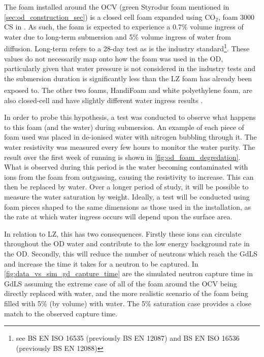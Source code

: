 \par
The foam installed around the OCV (green Styrodur foam mentioned in \autoref{sec:od_construction_sec}) is a closed cell foam expanded using CO$_2$, foam 3000 CS in \cite{styrodur_water_ingress_ref}.
As such, the foam is expected to experience a 0.7\% volume ingress of water due to long-term submersion and 5\% volume ingress of water from diffusion.
Long-term refers to a 28-day test as is the industry standard\footnote{see BS EN ISO 16535 (previously BS EN 12087) and BS EN ISO 16536 (previously BS EN 12088)}.
These values do not necessarily map onto how the foam was used in the OD, particularly given that water pressure is not considered in the industry tests and the submersion duration is significantly less than the LZ foam has already been exposed to.
The other two foams, HandiFoam\textsuperscript{\textregistered} and white polyethylene foam, are also closed-cell and have slightly different water ingress results \cite{handifoam_water_ingress_ref, white_foam_ref}. 
\par
In order to probe this hypothesis, a test was conducted to observe what happens to this foam (and the water) during submersion.
An example of each piece of foam used was placed in de-ionised water with nitrogen bubbling through it. 
The water resistivity was measured every few hours to monitor the water purity.
The result over the first week of running is shown in \autoref{fig:od_foam_degredation}.
What is observed during this period is the water becoming contaminated with ions from the foam from outgassing, causing the resistivity to increase.
This can then be replaced by water.
Over a longer period of study, it will be possible to measure the water saturation by weight.
Ideally, a test will be conducted using foam pieces shaped to the same dimensions as those used in the installation, as the rate at which water ingress occurs will depend upon the surface area.
\par
In relation to LZ, this has two consequences.
Firstly these ions can circulate throughout the OD water and contribute to the low energy background rate in the OD.
Secondly, this will reduce the number of neutrons which reach the GdLS and increase the time it takes for a neutron to be captured.
In \autoref{fig:data_vs_sim_gd_capture_time} are the simulated neutron capture time in GdLS assuming the extreme case of all of the foam around the OCV being directly replaced with water, and the more realistic scenario of the foam being filled with 5\% (by volume) with water.
The 5\% saturation case provides a close match to the observed capture time.

